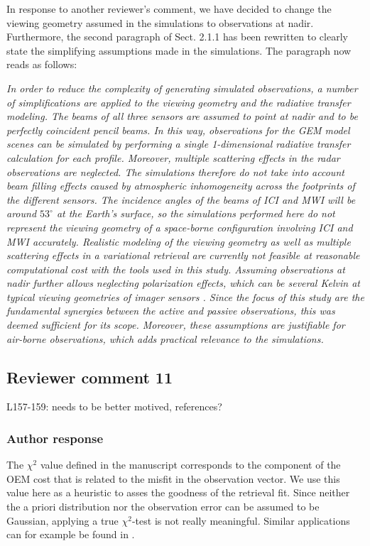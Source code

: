 \documentclass[11pt]{scrartcl}
\begin{document}
In response to another reviewer's comment, we have decided to change the viewing
geometry assumed in the simulations to observations at nadir. Furthermore, the
second paragraph of Sect. 2.1.1 has been rewritten to clearly state the simplifying
assumptions made in the simulations. The paragraph now reads as follows:

{\itshape In order to reduce the complexity of generating simulated observations, a number
of simplifications are applied to the viewing geometry and the radiative
transfer modeling. The beams of all three sensors are assumed to point at nadir
and to be perfectly coincident pencil beams. In this way, observations for the
GEM model scenes can be simulated by performing a single 1-dimensional radiative
transfer calculation for each profile. Moreover, multiple scattering effects in
the radar observations are neglected. The simulations therefore do not take into
account beam filling effects caused by atmospheric inhomogeneity across the
footprints of the different sensors. The incidence angles of the beams of ICI
and MWI will be around $53^\circ$ at the Earth's surface, so the simulations
performed here do not represent the viewing geometry of a space-borne
configuration involving ICI and MWI accurately. Realistic modeling of the
viewing geometry as well as multiple scattering effects in a variational
retrieval are currently not feasible at reasonable computational cost with the
tools used in this study. Assuming observations at nadir further allows neglecting
polarization effects, which can be several Kelvin at typical viewing geometries
of imager sensors \cite{xie15}. Since the focus of this study are the fundamental
synergies between the active and passive observations, this was deemed
sufficient for its scope. Moreover, these assumptions are justifiable for
air-borne observations, which adds practical relevance to the simulations.}



\subsection*{Reviewer comment 11}
L157-159: needs to be better motived, references?

\subsubsection*{Author response}

The $\chi^2$ value defined in the manuscript corresponds to the component of the OEM cost that
is related to the misfit in the observation vector. We use this value here as a heuristic
to asses the goodness of the retrieval fit. Since neither the a priori distribution nor the
observation error can be assumed to be Gaussian, applying a true $\chi^2$-test is not really
meaningful. Similar applications can for example be found in \citet{duncan16}.
\end{document}
